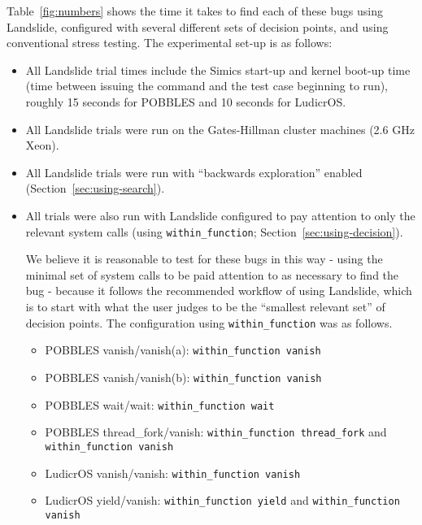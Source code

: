 Table~\ref{fig:numbers} shows the time it takes to find each of these bugs using Landslide, configured with several different sets of decision points, and using conventional stress testing. The experimental set-up is as follows:

\begin{itemize}
	\item All Landslide trial times include the Simics start-up and kernel boot-up time (time between issuing the command and the test case beginning to run), roughly 15 seconds for POBBLES and 10 seconds for LudicrOS.
	\item All Landslide trials were run on the Gates-Hillman cluster machines (2.6 GHz Xeon).
	\item All Landslide trials were run with ``backwards exploration'' enabled (Section~\ref{sec:using-search}).
	\item All trials were also run with Landslide configured to pay attention to only the relevant system calls (using \texttt{within\_function}; Section~\ref{sec:using-decision}).

	We believe it is reasonable to test for these bugs in this way - using the minimal set of system calls to be paid attention to as necessary to find the bug - because it follows the recommended workflow of using Landslide, which is to start with what the user judges to be the ``smallest relevant set'' of decision points. The configuration using \texttt{within\_function} was as follows.
	\begin{itemize}
		\item POBBLES vanish/vanish(a): \texttt{within\_function vanish}
		\item POBBLES vanish/vanish(b): \texttt{within\_function vanish}
		\item POBBLES wait/wait: \texttt{within\_function wait}
		\item POBBLES thread\_fork/vanish: \texttt{within\_function thread\_fork} and \texttt{within\_function vanish}
		\item LudicrOS vanish/vanish: \texttt{within\_function vanish}
		\item LudicrOS yield/vanish: \texttt{within\_function yield} and \texttt{within\_function vanish}
	\end{itemize}
\end{itemize}


